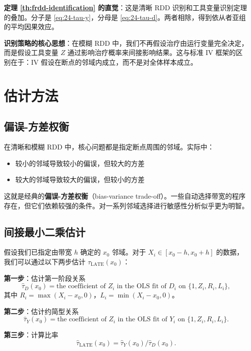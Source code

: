 \textbf{定理 \cref{th:frdd-identification} 的直觉}：这是清晰 RDD 识别和工具变量识别定理的叠加。分子是 \eqref{eq:24-tau-y}，分母是 \eqref{eq:24-tau-d}。两者相除，得到依从者亚组的平均因果效应。

\textbf{识别策略的核心思想}：在模糊 RDD 中，我们不再假设治疗由运行变量完全决定，而是假设工具变量 $Z$ 通过影响治疗概率来间接影响结果。这与标准 IV 框架的区别在于：IV 假设在断点的邻域内成立，而不是对全体样本成立。

\section{估计方法}

\subsection{偏误-方差权衡}

在清晰和模糊 RDD 中，核心问题都是指定断点周围的邻域。实际中：
\begin{itemize}
  \item 较小的邻域导致较小的偏误，但较大的方差
  \item 较大的邻域导致较大的偏误，但较小的方差
\end{itemize}

这就是经典的\textbf{偏误-方差权衡}（bias-variance trade-off）。一些自动选择带宽的程序存在，但它们依赖较强的条件。对一系列邻域选择进行敏感性分析似乎更为明智。

\subsection{间接最小二乘估计}

假设我们已指定由带宽 $h$ 确定的 $x_0$ 邻域。对于 $X_i \in [x_0 - h, x_0 + h]$ 的数据，我们可以通过以下两步估计 $\tau_{\mathrm{LATE}}(x_0)$：

\textbf{第一步}：估计第一阶段关系
\[
\hat{\tau}_D(x_0) = \text{the coefficient of } Z_i \text{ in the OLS fit of } D_i \text{ on } \{1, Z_i, R_i, L_i\},
\label{eq:24-first-stage}
\]
其中 $R_i = \max(X_i - x_0, 0)$，$L_i = \min(X_i - x_0, 0)$。

\textbf{第二步}：估计约简型关系
\[
\hat{\tau}_Y(x_0) = \text{the coefficient of } Z_i \text{ in the OLS fit of } Y_i \text{ on } \{1, Z_i, R_i, L_i\}.
\label{eq:24-reduced-form}
\]

\textbf{第三步}：计算比率
\[
\hat{\tau}_{\mathrm{LATE}}(x_0) = \hat{\tau}_Y(x_0) / \hat{\tau}_D(x_0).
\label{eq:24-ils-estimator}
\]

